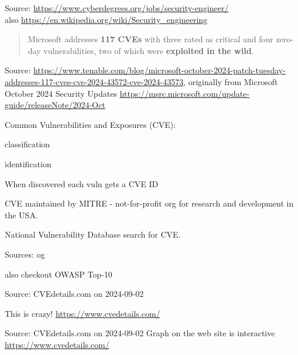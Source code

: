 \documentclass[Screen16to9,17pt]{foils}
\begin{document}
Source: \url{https://www.cyberdegrees.org/jobs/security-engineer/}\\
also
\url{https://en.wikipedia.org/wiki/Security_engineering}




\begin{quote}
Microsoft addresses {\bf 117 CVEs} with three rated as critical and four zero-day vulnerabilities, two of which were {\bf exploited in the wild}.
\end{quote}
Source: \url{https://www.tenable.com/blog/microsoft-october-2024-patch-tuesday-addresses-117-cves-cve-2024-43572-cve-2024-43573}, originally from Microsoft October 2024 Security Updates \url{https://msrc.microsoft.com/update-guide/releaseNote/2024-Oct}


\begin{list1}
\item Common Vulnerabilities and Exposures (CVE):
  \begin{list2}
  \item classification
  \item identification
  \end{list2}
\item When discovered each vuln gets a CVE ID
\item CVE maintained by MITRE - not-for-profit
org for research and development in the USA.
\item National Vulnerability Database search for CVE.
\item Sources:  og 
\item also checkout OWASP Top-10 
\end{list1}


Source: CVEdetails.com on 2024-09-02

\begin{list2}
\item This is crazy! \url{https://www.cvedetails.com/}
\end{list2}


Source: CVEdetails.com on 2024-09-02 Graph on the web site is interactive \url{https://www.cvedetails.com/}
\end{document}
